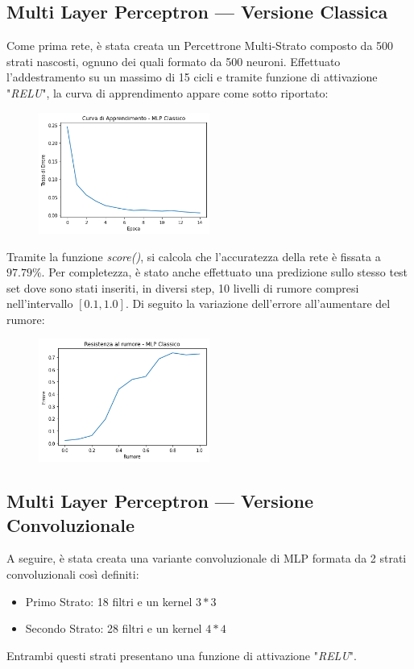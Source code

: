 \documentclass[12pt, a4paper]{article}
\begin{document}
\subsection{Multi Layer Perceptron --- Versione Classica}
Come prima rete, è stata creata un Percettrone Multi-Strato composto da 500 strati nascosti, ognuno dei quali formato da 500 neuroni. Effettuato l'addestramento su un massimo di 15 cicli e tramite funzione di attivazione "\textit{RELU}", la curva di apprendimento appare come sotto riportato:
\begin{figure}[H]
    \centering
    \includegraphics[width=0.50\textwidth]{Curva_MLP}
\end{figure}
Tramite la funzione \textit{score()}, si calcola che l'accuratezza della rete è fissata a \(97.79\%\).
Per completezza, è stato anche effettuato una predizione sullo stesso test set dove sono stati inseriti, in diversi step, 10 livelli di rumore compresi nell'intervallo \([0.1 , 1.0]\). Di seguito la variazione dell'errore all'aumentare del rumore:
\begin{figure}[H]
    \centering
    \includegraphics[width=0.50\textwidth]{Rumore_MLP.png}
\end{figure}

\subsection{Multi Layer Perceptron --- Versione Convoluzionale}
A seguire, è stata creata una variante convoluzionale di MLP formata da 2 strati convoluzionali così definiti:
\begin{itemize}
    \item Primo Strato: 18 filtri e un kernel \(3*3\)
    \item Secondo Strato: 28 filtri e un kernel \(4*4\)
\end{itemize}
Entrambi questi strati presentano una funzione di attivazione "\textit{RELU}".\\
\end{document}
